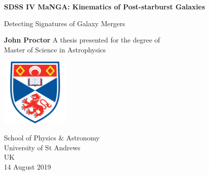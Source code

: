 
\begin{titlepage}
   \begin{center}
       \vspace*{1cm}
        
       \Huge
       \textbf{SDSS IV MaNGA: Kinematics of Post-starburst Galaxies}
 
       \vspace{0.5cm}
       \huge
       Detecting Signatures of Galaxy Mergers 
       \vspace{1.5cm}
 
       \textbf{John Proctor}
       \vfill
       A thesis presented for the degree of\\
       Master of Science in Astrophysics
 
       \vspace{2.5cm}
 
       \includegraphics[width=0.25\textwidth]{images/University-of-st-andrews-shield.png}
 
       \vspace{2.5cm}
       
       \Large
       School of Physics \& Astronomy\\
       University of St Andrews\\
       UK\\
       14 August 2019
   \end{center}
   
   
\end{titlepage}





